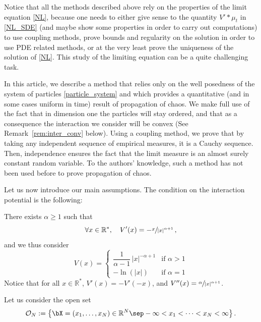 Notice that all the methods described above rely on the properties of the limit equation \eqref{NL}, because one needs to either give sense to the quantity $V'\ast\mu_t$ in \eqref{NL_SDE} (and maybe show some properties in order to carry out computations) to use coupling methods, prove bounds and regularity on the solution in order to use PDE related methods, or at the very least prove the uniqueness of the solution of \eqref{NL}. This study of the limiting equation can be a quite challenging task.\enlargethispage{.5\baselineskip}

In this article, we describe a method that relies only on the well posedness of the system of particles \eqref{particle_system} and which provides a quantitative (and in some cases uniform in time) result of propagation of chaos. We make full use of the fact that in dimension one the particles will stay ordered, and that as a consequence the interaction we consider will be convex (See Remark~\ref{rem:inter_conv} below). Using a coupling method, we prove that by taking any independent sequence of empirical measures, it is a Cauchy sequence. Then, independence ensures the fact that the limit measure is an almost surely constant random variable. To the authors' knowledge, such a method has not been used before to prove propagation of chaos.

Let us now introduce our main assumptions. The condition on the interaction potential is the following:
\begin{assumption}\label{Hyp_V}
There exists $\alpha\geq1$ such that\vspace*{-3pt}
\begin{equation}
\forall x\in\mathbb{R}^*,\quad V'(x)=-\sfrac{x}{|x|^{\alpha+1}}\,,
\end{equation}
and we thus consider\vspace*{-3pt}
\begin{equation}
V(x)=
\begin{cases}
\dfrac{1}{\alpha-1}\,|x|^{-{\alpha+1}}&\text{if }\alpha>1\\
-\ln(|x|)&\text{if }\alpha=1
\end{cases}
\end{equation}
Notice that for all $x\in\mathbb{R}^*$, $V'(x)=-V'(-x)$, and $V''(x)=\sfrac{\alpha}{|x|^{\alpha+1}}$.
\end{assumption}

Let us consider the open set\vspace*{-3pt}
\begin{align*}
\mathcal{O}_N:=\left\{\bX=(x_1,\dots,x_N)\in\mathbb{R}^N\sep -\infty<x_1<\cdots<x_N<\infty\right\}.
\end{align*}

